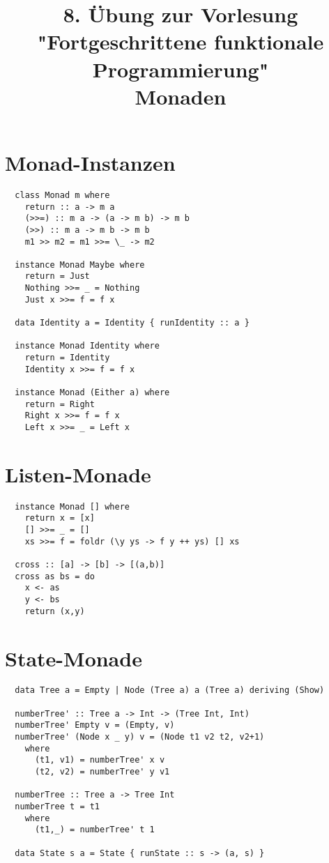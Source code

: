 \documentclass[a4paper]{article}
\title{\small{8. Übung zur Vorlesung "Fortgeschrittene funktionale Programmierung"}\\\vspace{.5cm}\huge{Monaden}}
\begin{document}
\maketitle

\section{Monad-Instanzen}

\begin{lstlisting}
  class Monad m where
    return :: a -> m a
    (>>=) :: m a -> (a -> m b) -> m b
    (>>) :: m a -> m b -> m b
    m1 >> m2 = m1 >>= \_ -> m2

  instance Monad Maybe where
    return = Just
    Nothing >>= _ = Nothing
    Just x >>= f = f x

  data Identity a = Identity { runIdentity :: a }

  instance Monad Identity where
    return = Identity
    Identity x >>= f = f x

  instance Monad (Either a) where
    return = Right
    Right x >>= f = f x
    Left x >>= _ = Left x
\end{lstlisting}

\section{Listen-Monade}

\begin{lstlisting}
  instance Monad [] where
    return x = [x]
    [] >>= _ = []
    xs >>= f = foldr (\y ys -> f y ++ ys) [] xs

  cross :: [a] -> [b] -> [(a,b)]
  cross as bs = do
    x <- as
    y <- bs
    return (x,y)
\end{lstlisting}

\newpage

\section{State-Monade}

\begin{lstlisting}
  data Tree a = Empty | Node (Tree a) a (Tree a) deriving (Show)

  numberTree' :: Tree a -> Int -> (Tree Int, Int)
  numberTree' Empty v = (Empty, v)
  numberTree' (Node x _ y) v = (Node t1 v2 t2, v2+1)
    where
      (t1, v1) = numberTree' x v
      (t2, v2) = numberTree' y v1

  numberTree :: Tree a -> Tree Int
  numberTree t = t1
    where
      (t1,_) = numberTree' t 1

  data State s a = State { runState :: s -> (a, s) }
\end{lstlisting}
\end{document}
